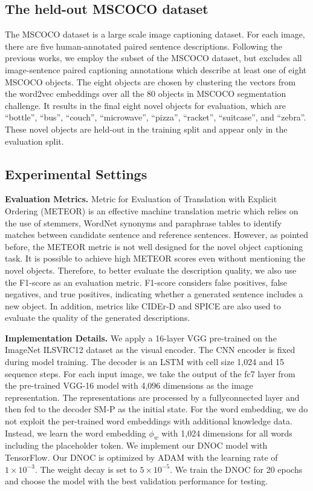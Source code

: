 \documentclass[a4paper, 11pt]{article} %
\begin{document}
\subsection{\textbf{The held-out MSCOCO dataset}}

The MSCOCO dataset is a large scale image captioning dataset. For each image, there are
five human-annotated paired sentence descriptions. Following the previous works, we employ
the subset of the MSCOCO dataset, but excludes all image-sentence paired captioning
annotations which describe at least one of eight MSCOCO objects. The eight objects are
chosen by clustering the vectors from the word2vec embeddings over all the 80 objects in
MSCOCO segmentation challenge. It results in the final eight novel objects for evaluation,
which are ``bottle'', ``bus'', ``couch'', ``microwave'', ``pizza'', ``racket'', ``suitcase'',
and ``zebra''. These novel objects are held-out in the training split and appear only in
the evaluation split.

\subsection{\textbf{Experimental Settings}}

\textbf{Evaluation Metrics.} Metric for Evaluation of Translation with Explicit Ordering
(METEOR) is an effective machine translation metric which relies on the use of stemmers,
WordNet synonyms and paraphrase tables to identify matches between candidate sentence and
reference sentences. However, as pointed before, the METEOR metric is not well designed
for the novel object captioning task. It is possible to achieve high METEOR scores even
without mentioning the novel objects. Therefore, to better evaluate the description quality,
we also use the F1-score as an evaluation metric. F1-score considers false positives, false
negatives, and true positives, indicating whether a generated sentence includes a new object.
In addition, metrics like CIDEr-D and SPICE are also used to evaluate the quality of the
generated descriptions.

\textbf{Implementation Details.} We apply a 16-layer VGG pre-trained on the ImageNet
ILSVRC12 dataset as the visual encoder. The CNN encoder is fixed during model training.
The decoder is an LSTM with cell size 1,024 and 15 sequence steps. For each input image,
we take the output of the fc7 layer from the pre-trained VGG-16 model with 4,096
dimensions as the image representation. The representations are processed by a
fullyconnected layer and then fed to the decoder SM-P as the initial state. For the word
embedding, we do not exploit the per-trained word embeddings with additional knowledge data.
Instead, we learn the word embedding $\phi_{w}$ with 1,024 dimensions for all words including
the placeholder token. We implement our DNOC model with TensorFlow. Our DNOC is optimized
by ADAM with the learning rate of $1 \times 10^{-3}$. The weight decay is set to
$5 \times 10^{-5}$. We train the DNOC for 20 epochs and choose the model with the best
validation performance for testing.
\end{document}
